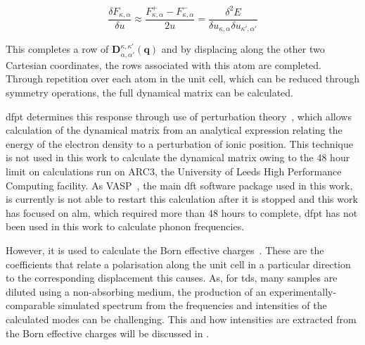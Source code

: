\begin{equation}
\frac{\delta F_{\kappa, \alpha}}{\delta u} \approx \frac{F_{\kappa, \alpha}^+ - F_{\kappa, \alpha}^-}{2u} = \frac{\delta^2 E}{\delta u_{\kappa, \alpha} \delta u_{\kappa', \alpha'}}
\end{equation}

This completes a row of \(\boldsymbol{D}_{\alpha, \alpha'}^{\kappa, \kappa'} (\boldsymbol{q})\) and by displacing along the other two Cartesian coordinates, the rows associated with this atom are completed. Through repetition over each atom in the unit cell, which can be reduced through symmetry operations, the full dynamical matrix can be calculated. 

\acrshort{dfpt} determines this response through use of perturbation theory~\cite{Baroni2001}, which allows calculation of the dynamical matrix from an analytical expression relating the energy of the electron density to a perturbation of ionic position. This technique is not used in this work to calculate the dynamical matrix owing to the 48 hour limit on calculations run on ARC3, the University of Leeds High Performance Computing facility. As VASP~\cite{Hafner2008}, the main \acrshort{dft} software package used in this work, is currently is not able to restart this calculation after it is stopped and this work has focused on \acrshort{alm}, which required more than 48 hours to complete, \acrshort{dfpt} has not been used in this work to calculate phonon frequencies. 

However, it is used to calculate the Born effective charges~\cite{Gonze1997}. These are the coefficients that relate a polarisation along the unit cell in a particular direction to the corresponding displacement this causes. As, for \acrshort{tds}, many samples are diluted using a non\nobreakdash-absorbing medium, the production of an experimentally\nobreakdash-comparable simulated spectrum from the frequencies and intensities of the calculated modes can be challenging. This and how intensities are extracted from the Born effective charges will be discussed in .

